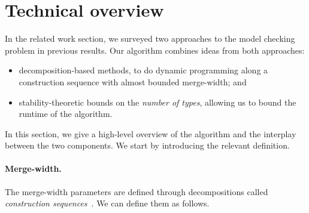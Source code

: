 \section{Technical overview}
\label{sec:tech-overview}

In the related work section, we surveyed two approaches to the model checking problem in previous results.
Our algorithm combines ideas from both approaches:
\begin{itemize}
  \item[--] decomposition-based methods, to do dynamic programming along a construction sequence with almost bounded merge-width; and
  \item[--]  stability-theoretic bounds on the \emph{number of types}, allowing us to bound the runtime of the algorithm.
\end{itemize}
In this section, we give a high-level overview of the algorithm and the interplay between the two components.
We start by introducing the relevant definition.

\paragraph{Merge-width.}
The merge-width parameters are defined through decompositions called \emph{construction sequences}~\cite{mw-stoc}.
We can define them as follows.

